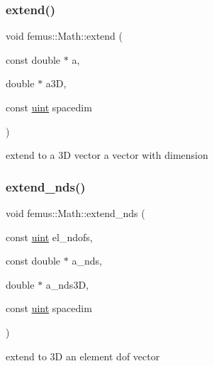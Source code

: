 \subsubsection{\texorpdfstring{extend()}{extend()}}
{\footnotesize\ttfamily void femus\+::\+Math\+::extend (\begin{DoxyParamCaption}\item[{const double $\ast$}]{a,  }\item[{double $\ast$}]{a3D,  }\item[{const \mbox{\hyperlink{_typedefs_8hpp_a91ad9478d81a7aaf2593e8d9c3d06a14}{uint}}}]{spacedim }\end{DoxyParamCaption})\hspace{0.3cm}{\ttfamily [inline]}}



extend to a 3D vector a vector with dimension 

\mbox{\label{namespacefemus_1_1_math_a2328868c7aa18860c4a4f14cd9573c8e}} 
\subsubsection{\texorpdfstring{extend\+\_\+nds()}{extend\_nds()}}
{\footnotesize\ttfamily void femus\+::\+Math\+::extend\+\_\+nds (\begin{DoxyParamCaption}\item[{const \mbox{\hyperlink{_typedefs_8hpp_a91ad9478d81a7aaf2593e8d9c3d06a14}{uint}}}]{el\+\_\+ndofs,  }\item[{const double $\ast$}]{a\+\_\+nds,  }\item[{double $\ast$}]{a\+\_\+nds3D,  }\item[{const \mbox{\hyperlink{_typedefs_8hpp_a91ad9478d81a7aaf2593e8d9c3d06a14}{uint}}}]{spacedim }\end{DoxyParamCaption})\hspace{0.3cm}{\ttfamily [inline]}}



extend to 3D an element dof vector 

\mbox{\label{namespacefemus_1_1_math_a02f12dcb565caafc80da2ebb652541fb}} 
